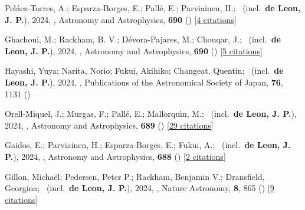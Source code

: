 \item[{\color{numcolor}\scriptsize74}] Pel{\'a}ez-Torres, A.; Esparza-Borges, E.; Pall{\'e}, E.; Parviainen, H.; \etal\ (incl.\ \textbf{de Leon, J. P.}), 2024, , Astronomy and Astrophysics, \textbf{690} () [\href{https://ui.adsabs.harvard.edu/abs/2024A&A...690A..62P}{4 citations}]

\item[{\color{numcolor}\scriptsize73}] Ghachoui, M.; Rackham, B. V.; D{\'e}vora-Pajares, M.; Chouqar, J.; \etal\ (incl.\ \textbf{de Leon, J. P.}), 2024, , Astronomy and Astrophysics, \textbf{690} () [\href{https://ui.adsabs.harvard.edu/abs/2024A&A...690A.263G}{5 citations}]

\item[{\color{numcolor}\scriptsize72}] Hayashi, Yuya; Narita, Norio; Fukui, Akihiko; Changeat, Quentin; \etal\ (incl.\ \textbf{de Leon, J. P.}), 2024, , Publications of the Astronomical Society of Japan, \textbf{76}, 1131 ()

\item[{\color{numcolor}\scriptsize71}] Orell-Miquel, J.; Murgas, F.; Pall{\'e}, E.; Mallorqu{\'\i}n, M.; \etal\ (incl.\ \textbf{de Leon, J. P.}), 2024, , Astronomy and Astrophysics, \textbf{689} () [\href{https://ui.adsabs.harvard.edu/abs/2024A&A...689A.179O}{29 citations}]

\item[{\color{numcolor}\scriptsize70}] Gaidos, E.; Parviainen, H.; Esparza-Borges, E.; Fukui, A.; \etal\ (incl.\ \textbf{de Leon, J. P.}), 2024, , Astronomy and Astrophysics, \textbf{688} () [\href{https://ui.adsabs.harvard.edu/abs/2024A&A...688L..34G}{2 citations}]

\item[{\color{numcolor}\scriptsize69}] Gillon, Micha{\"e}l; Pedersen, Peter P.; Rackham, Benjamin V.; Dransfield, Georgina; \etal\ (incl.\ \textbf{de Leon, J. P.}), 2024, , Nature Astronomy, \textbf{8}, 865 () [\href{https://ui.adsabs.harvard.edu/abs/2024NatAs...8..865G}{9 citations}]


